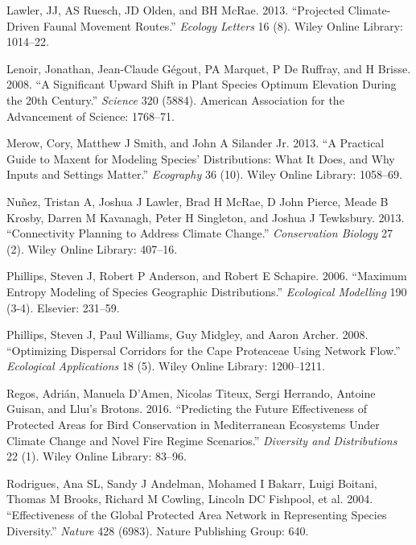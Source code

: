 \documentclass[]{article}
\begin{document}
\leavevmode\hypertarget{ref-lawler2013projected}{}%
Lawler, JJ, AS Ruesch, JD Olden, and BH McRae. 2013. ``Projected Climate-Driven Faunal Movement Routes.'' \emph{Ecology Letters} 16 (8). Wiley Online Library: 1014--22.

\leavevmode\hypertarget{ref-lenoir2008significant}{}%
Lenoir, Jonathan, Jean-Claude Gégout, PA Marquet, P De Ruffray, and H Brisse. 2008. ``A Significant Upward Shift in Plant Species Optimum Elevation During the 20th Century.'' \emph{Science} 320 (5884). American Association for the Advancement of Science: 1768--71.

\leavevmode\hypertarget{ref-merow2013practical}{}%
Merow, Cory, Matthew J Smith, and John A Silander Jr. 2013. ``A Practical Guide to Maxent for Modeling Species' Distributions: What It Does, and Why Inputs and Settings Matter.'' \emph{Ecography} 36 (10). Wiley Online Library: 1058--69.

\leavevmode\hypertarget{ref-nunez2013connectivity}{}%
Nuñez, Tristan A, Joshua J Lawler, Brad H McRae, D John Pierce, Meade B Krosby, Darren M Kavanagh, Peter H Singleton, and Joshua J Tewksbury. 2013. ``Connectivity Planning to Address Climate Change.'' \emph{Conservation Biology} 27 (2). Wiley Online Library: 407--16.

\leavevmode\hypertarget{ref-phillips2006maximum}{}%
Phillips, Steven J, Robert P Anderson, and Robert E Schapire. 2006. ``Maximum Entropy Modeling of Species Geographic Distributions.'' \emph{Ecological Modelling} 190 (3-4). Elsevier: 231--59.

\leavevmode\hypertarget{ref-phillips2008optimizing}{}%
Phillips, Steven J, Paul Williams, Guy Midgley, and Aaron Archer. 2008. ``Optimizing Dispersal Corridors for the Cape Proteaceae Using Network Flow.'' \emph{Ecological Applications} 18 (5). Wiley Online Library: 1200--1211.

\leavevmode\hypertarget{ref-regos2016predicting}{}%
Regos, Adrián, Manuela D'Amen, Nicolas Titeux, Sergi Herrando, Antoine Guisan, and Lluı's Brotons. 2016. ``Predicting the Future Effectiveness of Protected Areas for Bird Conservation in Mediterranean Ecosystems Under Climate Change and Novel Fire Regime Scenarios.'' \emph{Diversity and Distributions} 22 (1). Wiley Online Library: 83--96.

\leavevmode\hypertarget{ref-rodrigues2004effectiveness}{}%
Rodrigues, Ana SL, Sandy J Andelman, Mohamed I Bakarr, Luigi Boitani, Thomas M Brooks, Richard M Cowling, Lincoln DC Fishpool, et al. 2004. ``Effectiveness of the Global Protected Area Network in Representing Species Diversity.'' \emph{Nature} 428 (6983). Nature Publishing Group: 640.
\end{document}

